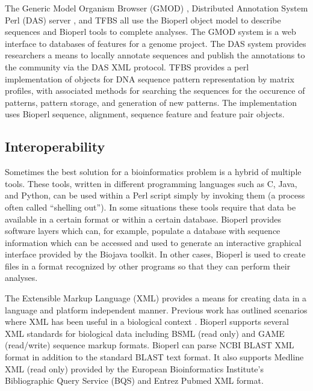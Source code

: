 \documentclass[12pt]{article}
\begin{document}
The Generic Model Organism Browser (GMOD) \cite{gmod}, Distributed
Annotation System Perl (DAS) server \cite{das}, and TFBS
\cite{tfbs} all use the Bioperl object model to describe sequences and
Bioperl tools to complete analyses.  The GMOD system is a web
interface to databases of features for a genome project.  The DAS
system provides researchers a means to locally annotate sequences and
publish the annotations to the community via the DAS XML protocol.
TFBS provides a perl implementation of objects for DNA sequence pattern
representation by matrix profiles, with associated methods for searching
the sequences for the occurence of patterns, pattern storage, and
generation of new patterns. The implementation uses Bioperl sequence,
alignment, sequence feature and feature pair objects.

\subsection{Interoperability}

Sometimes the best solution for a bioinformatics problem is a hybrid
of multiple tools.  These tools, written in different programming
languages such as C, Java, and Python, can be used within a Perl
script simply by invoking them (a process often called ``shelling
out'').  In some situations these tools require that data be available
in a certain format or within a certain database.  Bioperl provides
software layers which can, for example, populate a database with
sequence information which can be accessed and used to generate an
interactive graphical interface provided by the Biojava toolkit.
In other cases, Bioperl is used to create files in a format recognized
by other programs so that they can perform their analyses. 

The Extensible Markup Language (XML) provides a means for creating
data in a language and platform independent manner.  Previous work has
outlined scenarios where XML has been useful in a biological context
\cite{xmlbioinformatics}.  Bioperl supports several XML standards for
biological data including BSML (read only) and GAME (read/write)
sequence markup formats.  Bioperl can parse NCBI BLAST XML format in
addition to the standard BLAST text format.  It also supports Medline
XML (read only) provided by the European Bioinformatics Institute's
Bibliographic Query Service (BQS) and Entrez Pubmed XML format.
\end{document}
